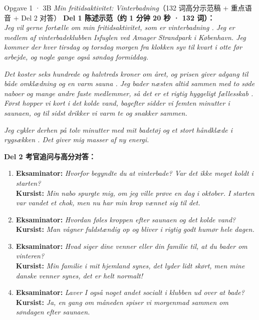 \begin{tipbox}{Opgave 1 · 3B \textit{Min fritidsaktivitet: Vinterbadning}（132 词高分示范稿 + 重点语音 + Del 2 对答）}
\small
\textbf{Del 1 陈述示范（约 1 分钟 20 秒 · 132 词）：}\\
\textit{Jeg vil gerne fortælle om min fritidsaktivitet, som er vinterbadning . Jeg er medlem af vinterbadeklubben Isfuglen ved Amager Strandpark i København. Jeg kommer der hver tirsdag og torsdag morgen fra klokken syv til kvart i otte før arbejde, og nogle gange også søndag formiddag.}

\textit{Det koster seks hundrede og halvtreds  kroner om året, og prisen giver adgang til både omklædning og en varm sauna . Jeg bader næsten altid sammen med to søde naboer og mange andre faste medlemmer, så det er et rigtig hyggeligt fællesskab . Først hopper vi kort i det kolde vand, bagefter sidder vi femten minutter i saunaen, og til sidst drikker vi varm te og snakker sammen.}

\textit{Jeg cykler derhen på tolv minutter med mit badetøj og et stort håndklæde  i rygsækken . Det giver mig masser af ny energi.}

\vspace{0.3em}
\textbf{Del 2 考官追问与高分对答：}
\begin{enumerate}
  \item \textbf{Eksaminator:} \textit{Hvorfor begyndte du at vinterbade? Var det ikke meget koldt i starten?}\\
  \textbf{Kursist:} \textit{Min nabo spurgte mig, om jeg ville prøve en dag i oktober. I starten var vandet et chok, men nu har min krop vænnet sig til det.}
  \item \textbf{Eksaminator:} \textit{Hvordan føles kroppen efter saunaen og det kolde vand?}\\
  \textbf{Kursist:} \textit{Man vågner fuldstændig op og bliver i rigtig godt humør hele dagen.}
  \item \textbf{Eksaminator:} \textit{Hvad siger dine venner eller din familie til, at du bader om vinteren?}\\
  \textbf{Kursist:} \textit{Min familie i mit hjemland synes, det lyder lidt skørt, men mine danske venner synes, det er helt normalt!}
  \item \textbf{Eksaminator:} \textit{Laver I også noget andet socialt i klubben ud over at bade?}\\
  \textbf{Kursist:} \textit{Ja, en gang om måneden spiser vi morgenmad sammen om søndagen efter saunaen.}
\end{enumerate}
\end{tipbox}

